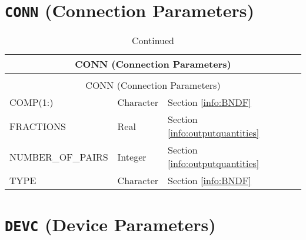 \vspace{\baselineskip}


\section{\texorpdfstring{{\tt CONN}}{CONN} (Connection Parameters)}

\begin{longtable}{@{\extracolsep{\fill}}|l|l|l|l|l|}
\caption[Boundary file parameters ({\ct CONN} namelist group)]{For more information see Section~\ref{info:BNDF}.}
\label{tbl:CONN} \\
\hline
\multicolumn{5}{|c|}{{\ct CONN} (Connection Parameters)} \\
\hline \hline
\endfirsthead
\caption[]{Continued} \\
\hline
\multicolumn{5}{|c|}{{\ct CONN} (Connection Parameters)} \\
\hline \hline
\endhead
{\ct COMP(1:)}          & Character     & Section \ref{info:BNDF}                 &           &   \\ \hline
{\ct FRACTIONS}          & Real   & Section \ref{info:outputquantities}     &           &                 \\ \hline
{\ct NUMBER\_OF\_PAIRS}          & Integer   & Section \ref{info:outputquantities}     &           &                 \\ \hline
{\ct TYPE}        & Character   & Section \ref{info:BNDF}                 &           &                 \\ \hline
\end{longtable}

\vspace{\baselineskip}


\section{\texorpdfstring{{\tt DEVC}}{DEVC} (Device Parameters)}

